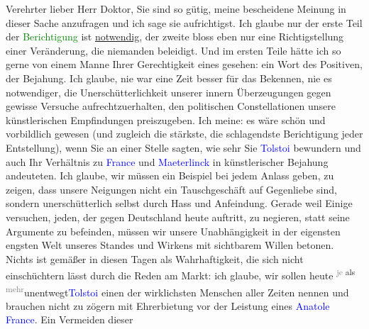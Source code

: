 \pstart
           Verehrter lieber Herr Doktor, Sie sind so gütig, meine bescheidene
               Meinung in dieser Sache anzufragen und ich sage sie aufrichtigst. Ich glaube nur der
               erste Teil der \textcolor{green}{Berichtigung}{}\ledrightnote{{$\rightarrow$}\textcolor{green}{Une protestation d’Arthur Schnitzler}}
               ist \uline{notwendig}, der zweite bloss eben nur eine
               Richtigstellung einer Veränderung, die niemanden beleidigt. Und im ersten Teile hätte
               ich so gerne von einem Manne Ihrer Gerechtigkeit eines gesehen: ein Wort des
               Positiven, der Bejahung. Ich glaube, nie war eine Zeit besser für das Bekennen, nie
               es notwendiger, die Unerschütterlichkeit unserer innern Überzeugungen gegen gewisse
               Versuche aufrechtzuerhalten, den {\pb}politischen Constellationen unsere künstlerischen Empfindungen preiszugeben. Ich
               meine: es wäre schön und vorbildlich gewesen (und zugleich die stärkste, die
               schlagendste Berichtigung jeder Entstellung), \strikeout{\textcolor{gray}{Sie}} wenn Sie an einer Stelle sagten, wie sehr Sie \textcolor{blue}{Tolstoi}{}\ledrightnote{\textcolor{blue}{Leo N. von Tolstoi}} bewundern und auch Ihr Verhältnis zu \textcolor{blue}{France}{}\ledrightnote{\textcolor{blue}{Anatole France}} und \textcolor{blue}{Maeterlinck}{}\ledrightnote{\textcolor{blue}{Maurice Maeterlinck}} in künstlerischer Bejahung andeuteten. Ich glaube, wir müssen
               ein Beispiel bei jedem Anlass geben, zu zeigen, dass unsere Neigungen nicht ein
               Tauschgeschäft auf Gegenliebe sind, sondern unerschütterlich selbst durch Hass und
               Anfeindung. Gerade weil Einige versuchen, jeden, der gegen Deutschland heute
               auftritt, zu negieren, statt seine Argumente zu befeinden, müssen wir unsere
               Unabhängigkeit in der eigensten engsten Welt unseres Standes und Wirkens {\pb}mit sichtbarem Willen betonen. Nichts
               ist gemäßer in diesen Tagen als Wahrhaftigkeit, die sich nicht einschüchtern lässt
               durch die Reden am Markt: ich glaube, wir sollen heute \substVorne{}\textsuperscript{\textcolor{gray}{je} als \textcolor{gray}{mehr}}{\allowbreak}\substDazwischen{}unentwegt\substHinten{}{ }\textcolor{blue}{Tolstoi}{}\ledrightnote{\textcolor{blue}{Leo N. von Tolstoi}} einen der wirklichsten Menschen aller
               Zeiten nennen und brauchen nicht zu zögern mit Ehrerbietung vor der Leistung eines
                  \textcolor{blue}{Anatole France}{}\ledrightnote{\textcolor{blue}{Anatole France}}. Ein Vermeiden dieser
